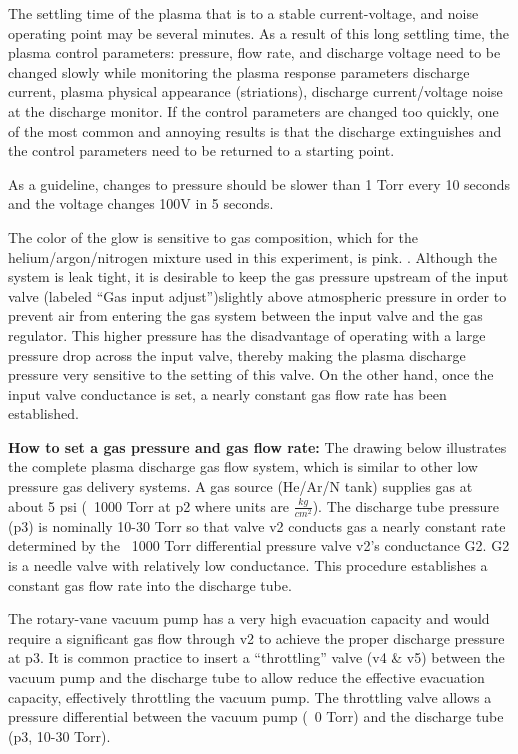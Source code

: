 \documentclass{../lab}
\begin{document}
The settling time of the plasma that is to a stable current-voltage, and noise operating point may be several minutes. As a result of this long settling time, the plasma control parameters: pressure, flow rate, and discharge voltage need to be changed slowly while monitoring the plasma response parameters discharge current, plasma physical appearance (striations), discharge current/voltage noise at the discharge monitor. If the control parameters are changed too quickly, one of the most common and annoying results is that the discharge extinguishes and the control parameters need to be returned to a starting point.

As a guideline, changes to pressure should be slower than 1 Torr every 10 seconds and the voltage changes 100V in 5 seconds.

The color of the glow is sensitive to gas composition, which for the helium/argon/nitrogen mixture used in this experiment, is pink. . Although the system is leak tight, it is desirable to keep the gas pressure upstream of the input valve (labeled ``Gas input adjust'')slightly above atmospheric pressure in order to prevent air from entering the gas system between the input valve and the gas regulator. This higher pressure has the disadvantage of operating with a large pressure drop across the input valve, thereby making the plasma discharge pressure very sensitive to the setting of this valve. On the other hand, once the input valve conductance is set, a nearly constant gas flow rate has been established.

\textbf{How to set a gas pressure and gas flow rate:} The drawing below illustrates the complete plasma discharge gas flow system, which is similar to other low pressure gas delivery systems. A gas source (He/Ar/N tank) supplies gas at about 5 psi (~1000 Torr  at p2 where units are $\frac{kg}{cm^2}$). The discharge tube pressure (p3) is nominally 10-30 Torr so that valve v2 conducts gas a nearly constant rate determined by the ~1000 Torr differential pressure valve v2’s conductance G2. G2 is a needle valve with relatively low conductance. This procedure establishes a constant gas flow rate into the discharge tube.

The rotary-vane vacuum pump has a very high evacuation capacity and would require a significant gas flow through v2 to achieve the proper discharge pressure at p3. It is common practice to insert a ``throttling'' valve (v4 \& v5) between the vacuum pump and the discharge tube to allow reduce the effective evacuation capacity, effectively throttling the vacuum pump. The throttling valve allows a pressure differential between the vacuum pump (~0 Torr) and the discharge tube (p3, 10-30 Torr).
\end{document}
